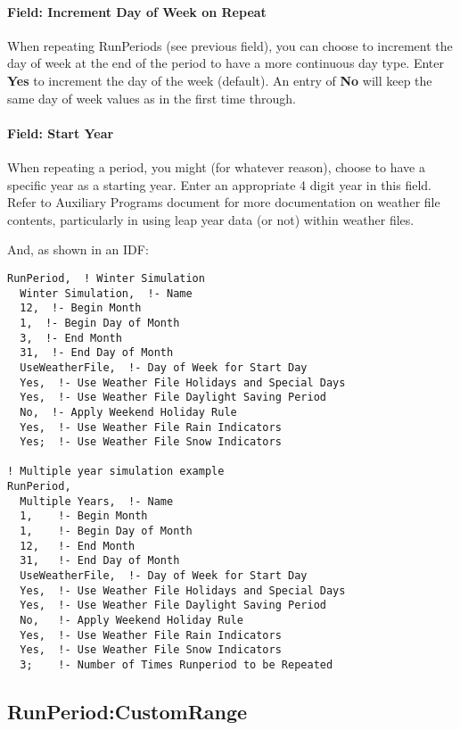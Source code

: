 \paragraph{Field: Increment Day of Week on Repeat}\label{field-increment-day-of-week-on-repeat}

When repeating RunPeriods (see previous field), you can choose to increment the day of week at the end of the period to have a more continuous day type. Enter \textbf{Yes} to increment the day of the week (default). An entry of \textbf{No} will keep the same day of week values as in the first time through.

\paragraph{Field: Start Year}\label{field-start-year}

When repeating a period, you might (for whatever reason), choose to have a specific year as a starting year. Enter an appropriate 4 digit year in this field. Refer to Auxiliary Programs document for more documentation on weather file contents, particularly in using leap year data (or not) within weather files.

And, as shown in an IDF:

\begin{lstlisting}
RunPeriod,  ! Winter Simulation
  Winter Simulation,  !- Name
  12,  !- Begin Month
  1,  !- Begin Day of Month
  3,  !- End Month
  31,  !- End Day of Month
  UseWeatherFile,  !- Day of Week for Start Day
  Yes,  !- Use Weather File Holidays and Special Days
  Yes,  !- Use Weather File Daylight Saving Period
  No,  !- Apply Weekend Holiday Rule
  Yes,  !- Use Weather File Rain Indicators
  Yes;  !- Use Weather File Snow Indicators

! Multiple year simulation example
RunPeriod,
  Multiple Years,  !- Name
  1,    !- Begin Month
  1,    !- Begin Day of Month
  12,   !- End Month
  31,   !- End Day of Month
  UseWeatherFile,  !- Day of Week for Start Day
  Yes,  !- Use Weather File Holidays and Special Days
  Yes,  !- Use Weather File Daylight Saving Period
  No,   !- Apply Weekend Holiday Rule
  Yes,  !- Use Weather File Rain Indicators
  Yes,  !- Use Weather File Snow Indicators
  3;    !- Number of Times Runperiod to be Repeated
\end{lstlisting}

\subsection{RunPeriod:CustomRange}\label{runperiodcustomrange}

